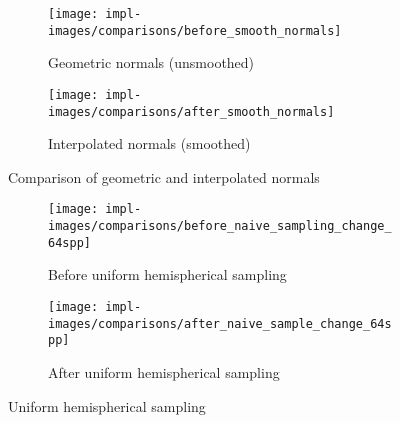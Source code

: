 \vspace{0.3em}
\begin{figure}[htb]
  \centering
  \begin{subfigure}[htb]{\textwidth}
    \texttt{[image: impl-images/comparisons/before\_smooth\_normals]}
    \caption{Geometric normals (unsmoothed)}
\label{fig:rayterm-gpu_unsmoothed_normals_large}
  \end{subfigure}
  \begin{subfigure}[htb]{\textwidth}
    \texttt{[image: impl-images/comparisons/after\_smooth\_normals]}
    \caption{Interpolated normals (smoothed)}
\label{fig:rayterm-gpu_smoothed_normals_large}
  \end{subfigure}
  \caption{Comparison of geometric and interpolated normals}
\label{fig:rayterm-gpu_smooth_normal_comparison_large}
\end{figure}

\vspace{0.3em}
\begin{figure}[htb]
  \centering
  \begin{subfigure}[htb]{\textwidth}
    \texttt{[image: impl-images/comparisons/before\_naive\_sampling\_change\_64spp]}
    \caption{Before uniform hemispherical sampling}
\label{fig:rayterm-gpu_hemispherical_sampling_before_large}
  \end{subfigure}
  \begin{subfigure}[htb]{\textwidth}
    \texttt{[image: impl-images/comparisons/after\_naive\_sample\_change\_64spp]}
    \caption{After uniform hemispherical sampling}
\label{fig:rayterm-gpu_hemispherical_sampling_after_large}
  \end{subfigure}
  \caption{Uniform hemispherical sampling}
\label{fig:rayterm-gpu_hemispherical_sampling_large}
\end{figure}

